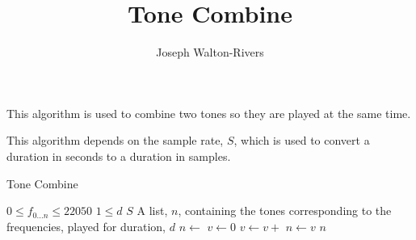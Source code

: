 \documentclass{../fal_assignment}
\title{Tone Combine}
\author{Joseph Walton-Rivers}
\begin{document}
\maketitle

This algorithm is used to combine two tones so they are played at the same time.

This algorithm depends on the sample rate, $S$, which is used to convert a duration in seconds to a duration in samples.

\begin{algorithm}[ht]
	\caption{Tone Combine}
	\label{alg:algorithm}
	
	\begin{algorithmic}[1]
		\Require
		\Statex $0 \le f_{0...n} \le 22050$ 
		\Statex $1 \le d$ 
		\Statex $S$ 
		\Ensure
		\Statex A list, $n$, containing the tones corresponding to the frequencies, played for duration, $d$
		\State $n\gets$ 
		\State $v\gets 0$
		\State $v\gets v +$ 
		\EndFor
		\State $n\gets v$
		\EndFor
		\State \Return $n$
		\EndFunction
	\end{algorithmic}
\end{algorithm}
\end{document}
